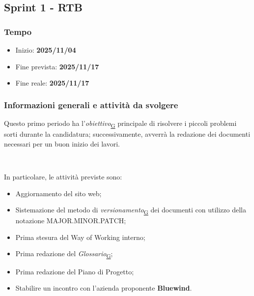 \documentclass[a4paper,12pt]{article}
\begin{document}
    \subsection{Sprint 1 - RTB}{
        \subsubsection{Tempo}{
            \begin{itemize}
                \item[]Inizio:  \textbf{2025/11/04} 
                \item[]Fine prevista:  \textbf{2025/11/17} 
                \item[]Fine reale:  \textbf{2025/11/17} 
            \end{itemize}
        }

        \subsubsection{Informazioni generali e attività da svolgere}{
            Questo primo periodo ha l'\textit{obiettivo}\textsubscript{\href{https://atlasteam9.github.io/Atlas/glossario.html\#Obiettivo}{G}} principale di risolvere i piccoli problemi sorti durante la candidatura; successivamente, avverrà la redazione dei documenti necessari per un buon inizio dei lavori. 
            
            \ 
            
            \noindent In particolare, le attività previste sono: %
            
            \begin{itemize}
                \item Aggiornamento del sito web;
                \item Sistemazione del metodo di \textit{versionamento}\textsubscript{\href{https://atlasteam9.github.io/Atlas/glossario.html\#Versionamento}{G}} dei documenti con utilizzo della notazione MAJOR.MINOR.PATCH;
                \item Prima stesura del Way of Working interno;
                \item Prima redazione del \textit{Glossario}\textsubscript{\href{https://atlasteam9.github.io/Atlas/glossario.html\#Glossario}{G}};
                \item Prima redazione del Piano di Progetto;
                \item Stabilire un incontro con l'azienda proponente \textbf{Bluewind}.
            \end{itemize}
        }

}
\end{document}

